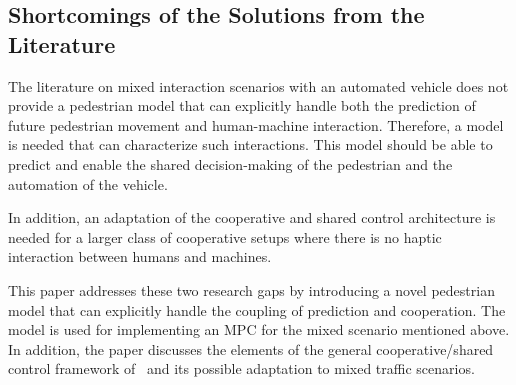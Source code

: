 \documentclass[conference]{IEEEtran}
\begin{document}
	
	\subsection{Shortcomings of the Solutions from the Literature}
	The literature on mixed interaction scenarios with an automated vehicle does not provide a pedestrian model that can explicitly handle both the prediction of future pedestrian movement and human-machine interaction. Therefore, a model is needed that can characterize such interactions. This model should be able to predict and enable the shared decision-making of the pedestrian and the automation of the vehicle.
	
	In addition, an adaptation of the cooperative and shared control architecture is needed for a larger class of cooperative setups where there is no haptic interaction between humans and machines.
	
	This paper addresses these two research gaps by introducing a novel pedestrian model that can explicitly handle the coupling of prediction and cooperation. The model is used for implementing an MPC for the mixed scenario mentioned above. In addition, the paper discusses the elements of the general cooperative/shared control framework of~\cite{2019_JoiningBluntPointy_flemisch} and its possible adaptation to mixed traffic scenarios.
	
	
	
	
	
\end{document}

